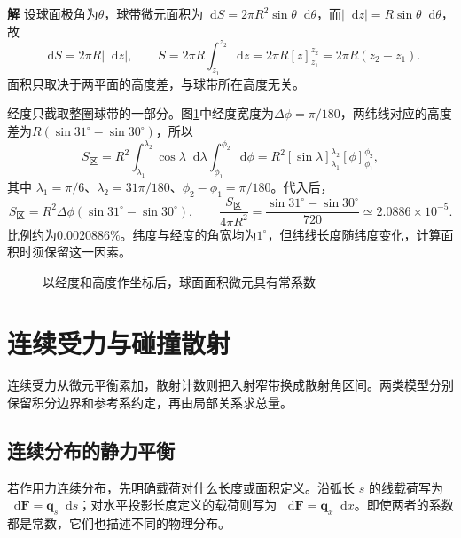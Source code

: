 \documentclass[11pt,openany,fontset=fandol]{ctexbook}
\theoremstyle{definition}\newtheorem{example}{例}[chapter]\newtheorem{exercise}{习题}[chapter]
\newcommand{\SolutionStart}{\par\medskip\ifdim\pagetotal>0pt\ifdim\dimexpr\pagegoal-\pagetotal\relax<3\baselineskip\newpage\fi\fi\noindent\textbf{解}\quad\ignorespaces}
\newenvironment{solution}{\SolutionStart}{\par\medskip}
\newcommand{\dd}{\mathop{}\!\mathrm d}\newcommand{\ee}{\mathrm e}\newcommand{\vct}[1]{\bm{#1}}
\begin{document}
\begin{solution}
设球面极角为$\theta$，球带微元面积为$\dd S=2\pi R^2\sin\theta\dd\theta$，而$|\dd z|=R\sin\theta\dd\theta$，故
\[
 \dd S=2\pi R|\dd z|,\qquad
 S=2\pi R\int_{z_1}^{z_2}\dd z
 =2\pi R[z]_{z_1}^{z_2}=2\pi R(z_2-z_1).
\]
面积只取决于两平面的高度差，与球带所在高度无关。

经度只截取整圈球带的一部分。图\ref{mp1:fig:rev:earth-s}中经度宽度为$\Delta\phi=\pi/180$，两纬线对应的高度差为$R(\sin31^\circ-\sin30^\circ)$，所以
\[
 S_{\text{区}}=R^2\int_{\lambda_1}^{\lambda_2}\cos\lambda\dd\lambda
 \int_{\phi_1}^{\phi_2}\dd\phi
 =R^2[\sin\lambda]_{\lambda_1}^{\lambda_2}[\phi]_{\phi_1}^{\phi_2},
 \]
其中 $\lambda_1=\pi/6$、$\lambda_2=31\pi/180$、$\phi_2-\phi_1=\pi/180$。代入后，
\[
 S_{\text{区}}=R^2\Delta\phi(\sin31^\circ-\sin30^\circ),
 \qquad
 \boxed{\frac{S_{\text{区}}}{4\pi R^2}
 =\frac{\sin31^\circ-\sin30^\circ}{720}
 \simeq2.0886\times10^{-5}}.
\]
比例约为$0.0020886\%$。纬度与经度的角宽均为$1^\circ$，但纬线长度随纬度变化，计算面积时须保留这一因素。

\begin{figure}[H]\centering
{}
\caption{以经度和高度作坐标后，球面面积微元具有常系数}\label{mp1:fig:rev:earth-s}
\end{figure}

\end{solution}

\section{连续受力与碰撞散射}
连续受力从微元平衡累加，散射计数则把入射窄带换成散射角区间。两类模型分别保留积分边界和参考系约定，再由局部关系求总量。

\subsection{连续分布的静力平衡}
若作用力连续分布，先明确载荷对什么长度或面积定义。沿弧长 $s$ 的线载荷写为 $\dd\vct F=\vct q_s\dd s$；对水平投影长度定义的载荷则写为 $\dd\vct F=\vct q_x\dd x$。即使两者的系数都是常数，它们也描述不同的物理分布。
\end{document}
